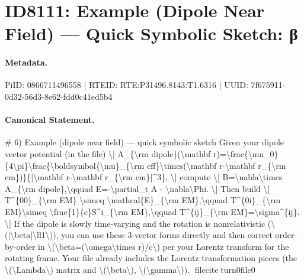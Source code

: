 \section*{ID8111: Example (Dipole Near Field) — Quick Symbolic Sketch: β}
\paragraph{Metadata.}
PiID: 0866711496558 | RTEID: RTE:P31496.8143:T1.6316 | UUID: 7f675911-0d32-56d3-8e62-fdd0c41ed5b4

\paragraph{Canonical Statement.}
\# 6) Example (dipole near field) — quick symbolic sketch Given your dipole vector potential (in the file) \textbackslash{}[ A\_\{\textbackslash{}rm dipole\}(\textbackslash{}mathbf r)=\textbackslash{}frac\{\textbackslash{}mu\_0\}\{4\textbackslash{}pi\}\textbackslash{}frac\{\textbackslash{}boldsymbol\{\textbackslash{}mu\}\_\{\textbackslash{}rm eff\}\textbackslash{}times(\textbackslash{}mathbf r-\textbackslash{}mathbf r\_\{\textbackslash{}rm cm\})\}\{|\textbackslash{}mathbf r-\textbackslash{}mathbf r\_\{\textbackslash{}rm cm\}|\textasciicircum{}3\}, \textbackslash{}] compute \textbackslash{}[ B=\textbackslash{}nabla\textbackslash{}times A\_\{\textbackslash{}rm dipole\},\textbackslash{}qquad E=-\textbackslash{}partial\_t A - \textbackslash{}nabla\textbackslash{}Phi. \textbackslash{}] Then build \textbackslash{}[ T\textasciicircum{}\{00\}\_\{\textbackslash{}rm EM\} \textbackslash{}simeq \textbackslash{}mathcal\{E\}\_\{\textbackslash{}rm EM\},\textbackslash{}qquad T\textasciicircum{}\{0i\}\_\{\textbackslash{}rm EM\}\textbackslash{}simeq \textbackslash{}frac\{1\}\{c\}S\textasciicircum{}i\_\{\textbackslash{}rm EM\},\textbackslash{}qquad T\textasciicircum{}\{ij\}\_\{\textbackslash{}rm EM\}=\textbackslash{}sigma\textasciicircum{}\{ij\}. \textbackslash{}] If the dipole is slowly time-varying and the rotation is nonrelativistic (\textbackslash{}(|\textbackslash{}beta|\textbackslash{}ll1\textbackslash{})), you can use these 3-vector forms directly and then correct order-by-order in \textbackslash{}(\textbackslash{}beta=(\textbackslash{}omega\textbackslash{}times r)/c\textbackslash{}) per your Lorentz transform for the rotating frame. Your file already includes the Lorentz transformation pieces (the \textbackslash{}(\textbackslash{}Lambda\textbackslash{}) matrix and \textbackslash{}(\textbackslash{}beta\textbackslash{}), \textbackslash{}(\textbackslash{}gamma\textbackslash{})). fileciteturn0file0

